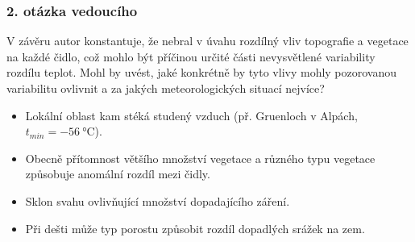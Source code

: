 \documentclass[
	11pt, %
]{beamer}
\begin{document}
\begin{frame}[plain] %
	\frametitle{2. otázka vedoucího}

V závěru autor konstantuje, že nebral v úvahu rozdílný vliv topografie a vegetace na každé čidlo, což mohlo být příčinou určité části nevysvětlené variability rozdílu teplot. Mohl by uvést, jaké konkrétně by tyto vlivy mohly pozorovanou variabilitu ovlivnit a za jakých meteorologických situací nejvíce?


\end{frame}

\begin{frame}
	\begin{itemize}
		\item Lokální oblast kam stéká studený vzduch (př. Gruenloch v Alpách, $t_{min}=\SI{-56}{\celsius}$).
		\item Obecně přítomnost většího množství vegetace a různého typu vegetace způsobuje anomální rozdíl mezi čidly.
		\item Sklon svahu ovlivňující množství dopadajícího záření.
		\item Při dešti může typ porostu způsobit rozdíl dopadlých srážek na zem.
	\end{itemize}
\end{frame}
\end{document}
